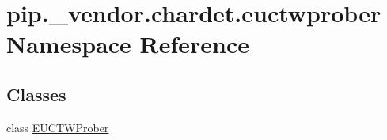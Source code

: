\hypertarget{namespacepip_1_1__vendor_1_1chardet_1_1euctwprober}{}\section{pip.\+\_\+vendor.\+chardet.\+euctwprober Namespace Reference}
\label{namespacepip_1_1__vendor_1_1chardet_1_1euctwprober}
\subsection*{Classes}
\begin{DoxyCompactItemize}
\item 
class \hyperlink{classpip_1_1__vendor_1_1chardet_1_1euctwprober_1_1EUCTWProber}{E\+U\+C\+T\+W\+Prober}
\end{DoxyCompactItemize}
